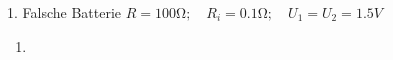 \documentclass{alex_hü}
\begin{document}
\renewcommand{\labelenumi}{\alph{enumi})}


\begin{mybox}{1. Falsche Batterie}
	\centering \( R = 100 \unit{\ohm};\quad R_i = 0.1 \unit{\ohm};\quad U_1 = U_2 = 1.5 \unit{V} \)
	\tcblower
	\begin{enumerate}
		\item 
	\end{enumerate}
\end{mybox}

%
%
\end{document}
